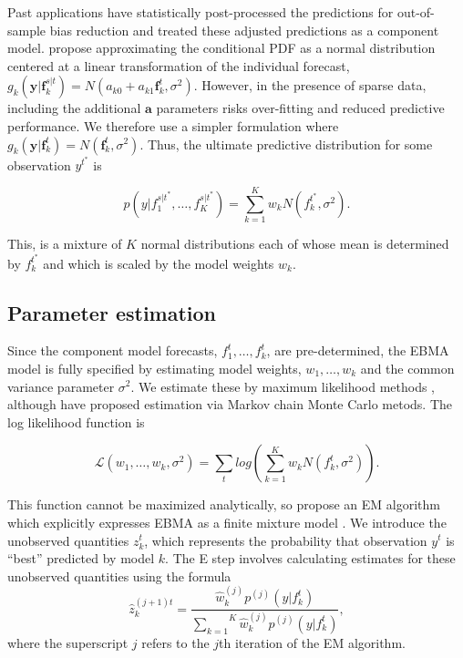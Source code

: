 \documentclass[12pt,fullpage,endnotes]{article}
\begin{document}
Past applications have statistically post-processed the predictions for
out-of-sample bias reduction and treated these adjusted predictions as a
component model. \citet{Raftery:2005} propose approximating the
conditional PDF as a normal distribution centered at a linear
transformation of the individual forecast,
$g_k(\mathbf{y}|\mathbf{f}_k^{s|t}) = N(a_{k0} +
a_{k1}\mathbf{f}_k^{t}, \sigma^2)$. However, in the presence of sparse
data, including the additional $\mathbf{a}$ parameters risks
over-fitting and reduced predictive performance.  We therefore use a
simpler formulation where $g_k(\mathbf{y}|\mathbf{f}_k^{t}) =
N(\mathbf{f}_k^{t}, \sigma^2)$.  Thus, the ultimate predictive
distribution for some observation $y^{t^\ast}$ is 

\begin{equation}
\label{pdf}p(y|f_1^{s|t^\ast},
\ldots, f_K^{s|t^\ast}) = \overset{K}{\underset{k=1}{\sum}} w_k
N(f_k^{t^\ast}, \sigma^2).
\end{equation}

\noindent This, is a mixture of $K$ normal distributions each of whose mean is
determined by $f_k^{t^\ast}$ and which is scaled by the model weights
$w_k$.

\subsection{Parameter estimation}

Since the component model forecasts, $f^t_1, \ldots, f^t_k$, are
pre-determined, the EBMA model is fully specified by estimating model
weights, $w_1, \ldots, w_k$ and the common variance parameter
$\sigma^2$.  We estimate these by maximum likelihood methods
\citep{Raftery:2005}, although \citet{Vrugt:2008} have proposed
estimation via Markov chain Monte Carlo metods.  The log likelihood
function is

\begin{equation}
\mathcal{L}(w_1, \ldots, w_k, \sigma^2)=\sum_tlog\left(\sum_{k=1}^Kw_kN(f^t_k, \sigma^2) \right).
\end{equation}


\noindent This function cannot be maximized analytically, so
\citet{Raftery:2005} propose an EM algorithm which explicitly
expresses EBMA as a finite mixture model \cite{mclachlan:peel:2000,imai:tingley:2012}.  We introduce the unobserved quantities
$z_k^t$, which represents the probability that observation $y^t$ is
``best'' predicted by model $k$.  The E step involves calculating
estimates for these unobserved quantities using the formula
\begin{equation}
\label{E-step}
\hat{z}^{(j+1)t}_{k} = \frac{\hat{w}^{(j)}_k
p^{(j)}(y|f_{k}^{t})}{\overset{K}{\underset{k=1}{\sum}}\hat{w}^{(j)}_kp^{(j)}(y|f_{k}^{t})},
\end{equation}
\noindent where the superscript $j$ refers to the $j$th iteration of
the EM algorithm.
\end{document}
